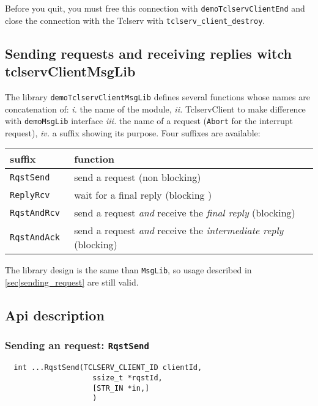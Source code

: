 Before you  quit, you must  free this connection with \texttt{demoTclservClientEnd}
and close the connection with the Tclserv with \texttt{tclserv\_client\_destroy}.


\subsection{Sending requests and receiving replies witch tclservClientMsgLib}

The library \texttt{demoTclservClientMsgLib}  defines  several functions whose
names are concatenation of: \emph{i.} the name of the module, \emph{ii.}
TclservClient to make difference with \texttt{demoMsgLib} interface \emph{iii.}
the name of a request (\texttt{Abort} for the interrupt request),  \emph{iv.}
a  suffix showing its purpose. Four suffixes are available:

\begin{center}\small\begin{tabularx}{\linewidth}{|l|X|}
\hline
suffix & function \\
\hline
\tt RqstSend & send a request (non blocking) \\

\tt ReplyRcv & wait for a final reply (blocking )\\

\tt RqstAndRcv & send a request \emph{and} receive the \emph{final reply}
(blocking) \\

\tt RqstAndAck & send a request \emph{and} receive the \emph{intermediate reply}
(blocking) \\
\hline
\end{tabularx}\end{center}

The library design is the same than \texttt{MsgLib}, so usage described in
\ref{sec|sending_request} are still valid.

\subsection{Api description}

\subsubsection{Sending an request: \texttt{RqstSend}}

\begin{center}\begin{cartouche}\small\begin{verbatim}
  int ...RqstSend(TCLSERV_CLIENT_ID clientId,
                    ssize_t *rqstId, 
                    [STR_IN *in,]
					)
\end{verbatim}\end{cartouche}\end{center}


